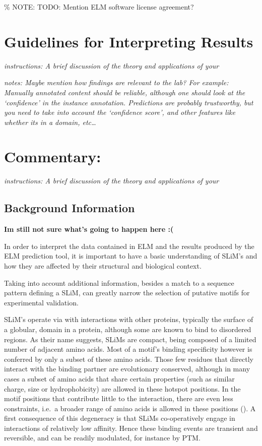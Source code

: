 \% NOTE: TODO: Mention ELM software license agreement?

\section{Guidelines for Interpreting
Results}\label{guidelines-for-interpreting-results}

\emph{instructions: A brief discussion of the theory and applications of
your}

\emph{notes: Maybe mention how findings are relevant to the lab? For
example: Manually annotated content should be reliable, although one
should look at the `confidence' in the instance annotation. Predictions
are probably trustworthy, but you need to take into account the
`confidence score', and other features like whether its in a domain,
etc\ldots{}}

\section{Commentary:}\label{commentary}

\emph{instructions: A brief discussion of the theory and applications of
your}

\subsection{Background Information}\label{background-information}

\textbf{Im still not sure what's going to happen here :(}

In order to interpret the data contained in ELM and the results produced
by the ELM prediction tool, it is important to have a basic
understanding of SLiM's and how they are affected by their structural
and biological context.

Taking into account additional information, besides a match to a
sequence pattern defining a SLiM, can greatly narrow the selection of
putative motifs for experimental validation.

SLiM's operate via with interactions with other proteins, typically the
surface of a globular, domain in a protein, although some are known to
bind to disordered regions. As their name suggests, SLiMs are compact,
being composed of a limited number of adjacent amino acids. Most of a
motif's binding specificity however is conferred by only a subset of
these amino acids. Those few residues that directly interact with the
binding partner are evolutionary conserved, although in many cases a
subset of amino acids that share certain properties (such as similar
charge, size or hydrophobicity) are allowed in these hotspot positions.
In the motif positions that contribute little to the interaction, there
are even less constraints, i.e.~a broader range of amino acids is
allowed in these positions (\cite{21909575}). A first consequence of
this degeneracy is that SLiMs co-operatively engage in interactions of
relatively low affinity. Hence these binding events are transient and
reversible, and can be readily modulated, for instance by PTM.

